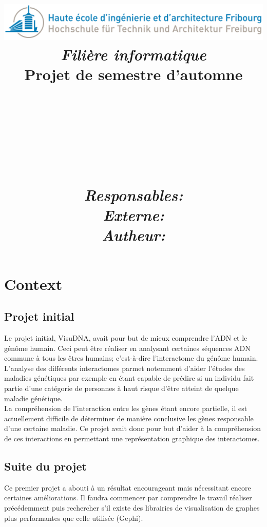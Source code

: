 \documentclass{article}
\title{
  \includegraphics[width=0.9\columnwidth]{Logo_HEIA}\\
  \vspace{1cm}
  \textmd{\textit{Filière informatique}} \\
  \vspace{2cm}
  \textmd{Projet de semestre d'automne}\\
  \textmd{\projDate}\\
  \vspace{1.5cm}
  \noindent\makebox[\linewidth]{\rule{\textwidth}{0.5pt}}\\
  \vspace{.5cm}
  \textmd{\textbf{\projName}}\\
  \textmd{\textbf{\docTitle}}\\
  \noindent\makebox[\linewidth]{\rule{\textwidth}{0.5pt}}\\
  \Large
  \vspace{3cm}
  \textit{Responsables:} \projSupervisors \\
  \vspace{1cm}
  \textit{Externe:} \projInitiator \\
  \vspace{1cm}
  \textit{Autheur:} \projAuthorName \\
  \author{}
}
\date{} %
\begin{document}
\maketitle


 \newpage



\section{Context}
\subsection{Projet initial}
  Le projet initial, VisuDNA, avait pour but de mieux comprendre l'ADN et le génôme humain. Ceci peut être réaliser en analysant certaines séquences ADN commune à tous les êtres humains; c'est-à-dire l'interactome du génôme humain.  L'analyse des différents interactomes parmet notemment d'aider l'études des maladies génétiques par exemple en étant capable de prédire si un individu fait partie d'une catégorie de personnes à haut risque d'être atteint de quelque maladie génétique.
  \\
  La compréhension de l'interaction entre les gènes étant encore partielle, il est actuellement difficile de déterminer de manière conclusive les gènes responsable d'une certaine maladie. Ce projet avait donc pour but d'aider à la compréhension de ces interactions en permettant une représentation graphique des interactomes.
\cite{Sisto:2014}

\subsection{Suite du projet}
  Ce premier projet a abouti à un résultat encourageant mais nécessitant encore certaines améliorations. Il faudra commencer par comprendre le travail réaliser précédemment puis rechercher s'il existe des librairies de visualisation de graphes plus performantes que celle utilisée (Gephi).
\end{document}
